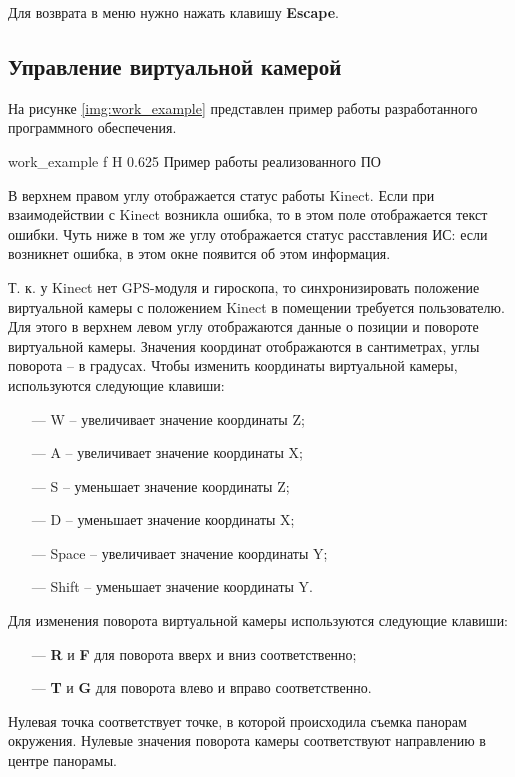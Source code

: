 Для возврата в меню нужно нажать клавишу \textbf{Escape}.

\subsection{Управление виртуальной камерой}

На рисунке \ref{img:work_example} представлен пример работы разработанного программного обеспечения.

{work_example}
{f}
{H}
{0.625\textwidth}
{Пример работы реализованного ПО}

В верхнем правом углу отображается статус работы Kinect. Если при взаимодействии с Kinect возникла ошибка, то в этом поле отображается текст ошибки. Чуть ниже в том же углу отображается статус расставления ИС: если возникнет ошибка, в этом окне появится об этом информация.

Т. к. у Kinect нет GPS-модуля и гироскопа, то синхронизировать положение виртуальной камеры с положением Kinect в помещении требуется пользователю. Для этого в верхнем левом углу отображаются данные о позиции и повороте виртуальной камеры. Значения координат отображаются в сантиметрах, углы поворота -- в градусах. Чтобы изменить координаты виртуальной камеры, используются следующие клавиши:

\begin{itemize}
	\item[---] W -- увеличивает значение координаты Z;
	\item[---] A -- увеличивает значение координаты X;
	\item[---] S -- уменьшает значение координаты Z;
	\item[---] D -- уменьшает значение координаты X;
	\item[---] Space -- увеличивает значение координаты Y;
	\item[---] Shift -- уменьшает значение координаты Y.
\end{itemize}

Для изменения поворота виртуальной камеры используются следующие клавиши:

\begin{itemize}
	\item[---] \textbf{R} и \textbf{F} для поворота вверх и вниз соответственно;
	\item[---] \textbf{T} и \textbf{G} для поворота влево и вправо соответственно.
\end{itemize}

Нулевая точка соответствует точке, в которой происходила съемка панорам окружения. Нулевые значения поворота камеры соответствуют направлению в центре панорамы.

